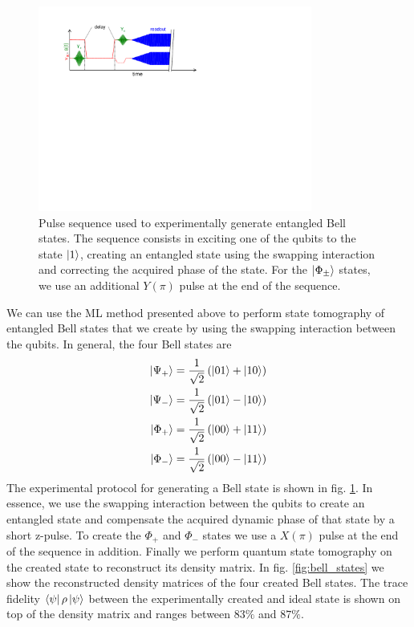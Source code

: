 \begin{figure}
	\centering
	\includegraphics[width=9cm]{"./material/figures/measurement/bell_state_creation"}
	\caption[]{Pulse sequence used to experimentally generate entangled Bell states. The sequence consists in exciting one of the qubits to the state $\left| 1 \right>$, creating an entangled state using the swapping interaction and correcting the acquired phase of the state. For the $\left| \Phi_\pm \right>$ states, we use an additional $Y(\pi)$ pulse at the end of the sequence.}
	\label{fig:bell_generation_pulse_sequence}
\end{figure}

We can use the ML method presented above to perform state tomography of entangled Bell states that we create by using the swapping interaction between the qubits. In general, the four Bell states are
%
\begin{eqnarray}
\left| \Psi_+ \right> = \frac{1}{\sqrt{2}}\left(\left| 01 \right>+\left| 10 \right>\right) \\
\left| \Psi_- \right> = \frac{1}{\sqrt{2}}\left(\left| 01 \right>-\left| 10 \right>\right) \\
\left| \Phi_+ \right> = \frac{1}{\sqrt{2}}\left(\left| 00 \right>+\left| 11 \right>\right) \\
\left| \Phi_- \right> = \frac{1}{\sqrt{2}}\left(\left| 00 \right>-\left| 11 \right>\right)
\end{eqnarray}
%
The experimental protocol for generating a Bell state is shown in fig. \ref{fig:bell_generation_pulse_sequence}. In essence, we use the swapping interaction between the qubits to create an entangled state and compensate the acquired dynamic phase of that state by a short z-pulse. To create the $\Phi_+$ and $\Phi_-$ states we use a $X(\pi)$ pulse at the end of the sequence in addition. Finally we perform quantum state tomography on the created state to reconstruct its density matrix. In fig. \ref{fig:bell_states} we show the reconstructed density matrices of the four created Bell states. The trace fidelity $\left< \psi \right|\rho\left| \psi \right>$ between the experimentally created and ideal state is shown on top of the density matrix and ranges between $83 \%$ and $87 \%$.


